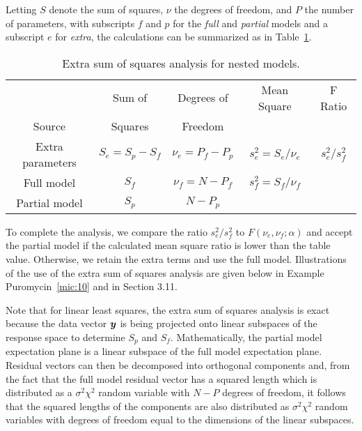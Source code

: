 Letting $S$ denote the sum of squares, $\nu$ the degrees of
freedom, and $P$ the number of parameters, with subscripts $f$
and $p$ for the \emph{full}
and \emph{partial} models and a subscript $e$
for \emph{extra},
the calculations can be summarized as in
Table~\ref{tbl:extra}.
\begin{table}
  \caption{Extra sum of squares analysis for nested models.}
  \label{tbl:extra}
  \begin{center}
    \begin{tabular}{c  c  c  c  c} \hline
      & \multicolumn{1}{c}{Sum of} & \multicolumn{1}{c}{Degrees of}
      &\multicolumn{1}{c}{Mean Square} & \multicolumn{1}{c}{F Ratio}\\
      \multicolumn{1}{c}{Source} & \multicolumn{1}{c}{Squares}
      &\multicolumn{1}{c}{Freedom} \\ \hline Extra parameters&$S_e = S_p -
      S_{f}$& $\nu_e = P_f - P_{p}$&$s_e^2 = S_e / \nu_{e}$&
      ${s_e^2}/{s_f^2}$\\ Full model&$S_{f}$&$\nu_f = N - P_{f}$& $s_f^2 =
      S_f / \nu_{f}$\\ \hline Partial model&$S_{p}$&$N - P_{p}$\\ \hline
    \end{tabular}
  \end{center}
\end{table}
To complete the analysis, we compare the ratio $s_e^2 / s_f^{2}$ to
$F(\nu_e,\nu_f;\alpha)$ and accept the 
partial model if the calculated mean square ratio is lower than the
table value.
Otherwise, we retain the extra terms and use the full model.
Illustrations of the use of the extra sum of squares analysis are
given below in Example Puromycin~\ref{mic:10} and in Section 3.11.

Note that for linear least squares, the extra sum of squares
analysis is exact because the
data vector ${\boldsymbol y}$ is being projected onto linear subspaces of the
response space to determine $S_{p}$ and $S_{f}$.
Mathematically, the partial model
expectation plane is a linear subspace of the full model
expectation plane.
Residual vectors can then be decomposed into orthogonal
components and, from the fact that the full model residual vector
has a squared length which is distributed as a
$\sigma^2 \chi^{2}$ random variable with $N - P$ degrees of
freedom, it follows that the squared lengths of the components
are also distributed as $\sigma^2 \chi^{2}$ random variables
with degrees of freedom equal to the dimensions of the linear
subspaces.

